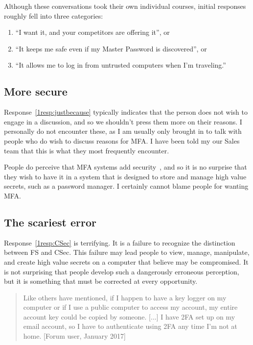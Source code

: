\documentclass[12pt]{article}
\newcommand{\prop}[1]{\textsf{#1}}
\begin{document}
Although these conversations took their own individual courses,
initial responses roughly fell into three categories:
\begin{enumerate}
  \item “I want it, and your competitors are offering it”, or \label{1resp:justbecause}
  \item “It keeps me safe even if my Master Password is discovered”, or \label{1resp:FS}
  \item “It allows me to log in from untrusted computers when I'm traveling.”\label{1resp:CSec}
\end{enumerate}

\subsection{More secure}
Response~\ref{1resp:justbecause} typically indicates that the person does not wish to engage in a discussion, and so we shouldn't press them more on their reasons.
I personally do not encounter these, as I am usually only brought in to talk with people who do wish to discuss reasons for MFA\@.
I have been told my our Sales team that this is what they most frequently encounter.

People do perceive that MFA systems add security~\autocites{gunsonETAL2011:CS,CristofaroDFN13},
and so it is no surprise that they wish to have it in a system that is designed to store and manage high value secrets, such as a password manager.
I certainly cannot blame people for wanting MFA\@.

\subsection{The scariest error}

Response~\ref{1resp:CSec} is terrifying.
It is a failure to recognize the distinction between \prop{FS} and  \prop{CSec}.
This failure may lead people to view, manage, manipulate, and create high value
secrets on a computer that believe may be compromised. It is not surprising that people develop such a dangerously erroneous perception, but it is something that must be corrected at every opportunity.

\begin{quotation}
  Like others have mentioned, if I happen to have a key logger on my computer or if I use a public computer to access my account, my entire account key could be copied by someone. [...] I have 2FA set up on my email account, so I have to authenticate using 2FA any time I'm not at home.
  [Forum user, January 2017]
\end{quotation}
\end{document}
